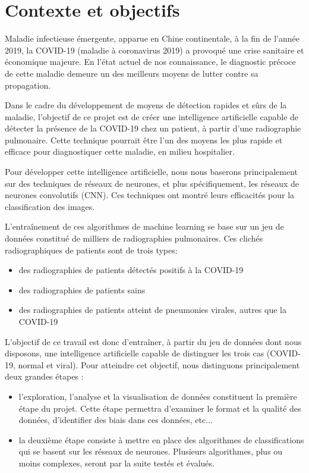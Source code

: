 \documentclass[11pt,twoside,openright]{article}
\begin{document}
\renewcommand{\thepage}{}

\renewcommand{\thepage}{\arabic{page}}
\setcounter{page}{1}

\tableofcontents
\newpage
\section{Contexte et objectifs}
Maladie infectieuse émergente, apparue en Chine continentale, à la fin de l'année 2019, la COVID-19 (maladie à coronavirus 2019) a provoqué une crise sanitaire et économique majeure. En l'état actuel de nos connaissance, le diagnostic précoce de cette maladie demeure un des meilleurs moyens de lutter contre sa propagation. 

Dans le cadre du développement de moyens de détection rapides et sûrs de la maladie, l'objectif de ce projet est de créer une intelligence artificielle capable de détecter la présence de la COVID-19 chez un patient, à partir d'une radiographie pulmonaire. Cette technique pourrait être l'un des moyens les plus rapide et efficace pour diagnostiquer cette maladie, en milieu hospitalier.

Pour développer cette intelligence artificielle, nous nous baserons principalement sur des techniques de réseaux de neurones, et plus spécifiquement, les réseaux de neurones convolutifs (CNN). Ces techniques ont montré leurs efficacités pour la classification des images.

L'entraînement de ces algorithmes de machine learning se base sur un jeu de données constitué de milliers de radiographies pulmonaires. 
Ces clichés radiographiques de patients sont de trois types: 
\begin{itemize}
 	\item des radiographies de patients détectés positifs à la COVID-19 
    \item des radiographies de patients sains
    \item des radiographies de patients atteint de pneumonies virales, autres que la COVID-19
\end{itemize}

L'objectif de ce travail est donc d'entraîner, à partir du jeu de données dont nous disposons, une intelligence artificielle capable de distinguer les trois cas (COVID-19, normal et viral). Pour atteindre cet objectif, nous distinguons principalement deux grandes étapes :
\begin{itemize}
    \item l'exploration, l'analyse et la visualisation de données constituent la première étape du projet. Cette étape permettra d'examiner le format et la qualité des données, d'identifier des biais dans ces données, etc...
    \item la deuxième étape consiste à mettre en place des algorithmes de classifications qui se basent sur les réseaux de neurones. Plusieurs algorithmes, plus ou moins complexes, seront par la suite testés et évalués. 
\end{itemize}
\newpage
\end{document}
